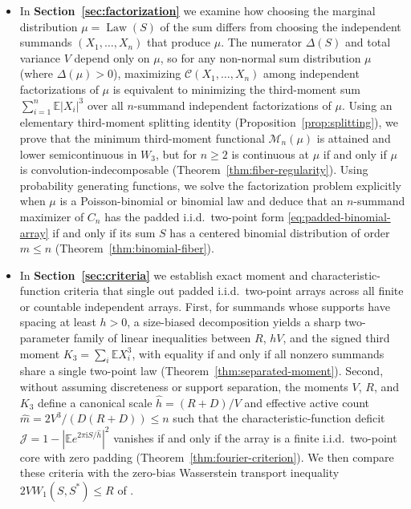 \documentclass[11pt]{article}
\numberwithin{equation}{section}
\theoremstyle{definition}
\theoremstyle{remark}
\DeclareMathOperator{\Law}{Law}
\newcommand{\E}{\mathbb E}
\newcommand{\ii}{\mathrm i}
\begin{document}
\begin{itemize}[leftmargin=2em]
\item In \textbf{Section~\ref{sec:factorization}} we examine how choosing the
marginal distribution $\mu=\Law(S)$ of the sum differs from choosing the
independent summands $(X_1,\ldots,X_n)$ that produce $\mu$. The numerator
$\Delta(S)$ and total variance $V$ depend only on $\mu$, so for any non-normal
sum distribution $\mu$ (where $\Delta(\mu)>0$), maximizing
$\mathcal C(X_1,\ldots,X_n)$ among independent factorizations of $\mu$ is
equivalent to minimizing the third-moment sum $\sum_{i=1}^n\E|X_i|^3$ over all
$n$-summand independent factorizations of $\mu$. Using an elementary
third-moment splitting identity (Proposition~\ref{prop:splitting}), we prove
that the minimum third-moment functional $\mathcal M_n(\mu)$ is attained and
lower semicontinuous in $W_3$, but for $n\ge2$ is continuous at $\mu$ if and
only if $\mu$ is convolution-indecomposable (Theorem~\ref{thm:fiber-regularity}).
Using probability generating functions, we solve the factorization problem
explicitly when $\mu$ is a Poisson-binomial or binomial law and deduce that
an $n$-summand maximizer of $C_n$ has the padded i.i.d.\ two-point form
\eqref{eq:padded-binomial-array} if and only if its sum $S$ has a centered
binomial distribution of order $m\le n$ (Theorem~\ref{thm:binomial-fiber}).

\item In \textbf{Section~\ref{sec:criteria}} we establish exact moment and
characteristic-function criteria that single out padded i.i.d.\ two-point
arrays across all finite or countable independent arrays. First, for
summands whose supports have spacing at least $h>0$, a size-biased
decomposition yields a sharp two-parameter family of linear inequalities
between $R$, $hV$, and the signed third moment $K_3=\sum_i\E X_i^3$, with
equality if and only if all nonzero summands share a single two-point law
(Theorem~\ref{thm:separated-moment}). Second, without assuming discreteness or
support separation, the moments $V$, $R$, and $K_3$ define a canonical scale
$\widehat h=(R+D)/V$ and effective active count $\widehat m=2V^3/(D(R+D))\le n$
such that the characteristic-function deficit
$\mathcal J=1-|\E e^{2\pi\ii S/\widehat h}|^2$ vanishes if and only if the
array is a finite i.i.d.\ two-point core with zero padding
(Theorem~\ref{thm:fourier-criterion}). We then compare these criteria with
the zero-bias Wasserstein transport inequality $2VW_1(S,S^*)\le R$ of
\citet{BellTransport2026}.


\end{itemize}
\end{document}

